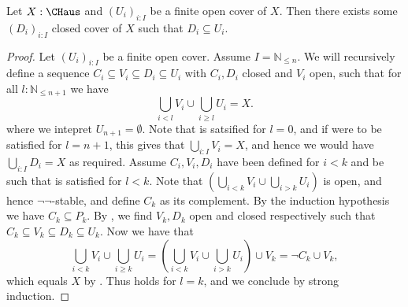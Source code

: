 \begin{lemma}\label{ClosedRefinement}
  Let $X:\CHaus$ and $(U_i)_{i:I}$ be a finite open cover of $X$. Then there exists some $(D_i)_{i:I}$ closed cover of $X$ such that $D_i \subseteq U_i$. 
\end{lemma}
\begin{proof}
  Let $(U_i)_{i:I}$ be a finite open cover. 
  Assume $I = \mathbb N_{\leq n}$. 
  We will recursively define a sequence $C_i \subseteq V_i \subseteq D_i \subseteq U_i$
  with $C_i,D_i$ closed and $V_i$ open, such that for all $l:\mathbb N_{\leq n+1}$ we have 
  \begin{equation}\label{inductionLoop}\bigcup_{i < l} V_i \cup \bigcup_{i\geq l} U_i = X.\end{equation}
  where we intepret $U_{n+1} = \emptyset$. Note that  is satsified for $l=0$, and if were to be satisfied for $l=n+1$, this gives that $\bigcup_{i:I} V_i = X$, and hence we would have $\bigcup_{i:I} D_i = X$ as required. 
%
  Assume $C_i,V_i,D_i$ have been defined for $i<k$ and be such that  is satisfied for $l<k$. 
  Note that $(\bigcup_{i<k} V_i \cup \bigcup_{i>k} U_i)$ is open, and hence $\neg\neg$-stable, and define $C_k$ as its complement. By the induction hypothesis we have $C_k \subseteq P_k$. By , we find $V_k,D_k$ open and closed respectively such that 
  $C_k \subseteq V_k \subseteq D_k \subseteq U_k$. 
  Now we have that 
  $$
  \bigcup_{i< k} V_i \cup \bigcup_{i\geq k} U_i = 
  (\bigcup_{i<k}V_i \cup 
  \bigcup_{i>k} U_i)
  \cup V_k 
  = 
  \neg C_k \cup V_k,
  $$
  which equals $X$ by . 
  Thus  holds for $l=k$, and we conclude by strong induction. 
\end{proof}


